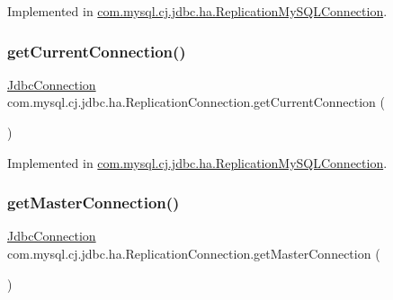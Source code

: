 Implemented in \mbox{\hyperlink{classcom_1_1mysql_1_1cj_1_1jdbc_1_1ha_1_1_replication_my_s_q_l_connection_a4d63ae17059125762c0103bbaed5e3c7}{com.\+mysql.\+cj.\+jdbc.\+ha.\+Replication\+My\+S\+Q\+L\+Connection}}.

\mbox{\label{interfacecom_1_1mysql_1_1cj_1_1jdbc_1_1ha_1_1_replication_connection_a0bfb42722305b18722f782067f85d538}} 
\subsubsection{\texorpdfstring{get\+Current\+Connection()}{getCurrentConnection()}}
{\footnotesize\ttfamily \mbox{\hyperlink{interfacecom_1_1mysql_1_1cj_1_1jdbc_1_1_jdbc_connection}{Jdbc\+Connection}} com.\+mysql.\+cj.\+jdbc.\+ha.\+Replication\+Connection.\+get\+Current\+Connection (\begin{DoxyParamCaption}{ }\end{DoxyParamCaption})}



Implemented in \mbox{\hyperlink{classcom_1_1mysql_1_1cj_1_1jdbc_1_1ha_1_1_replication_my_s_q_l_connection_a0d98dee5ddb333ca8f8cab2f41755205}{com.\+mysql.\+cj.\+jdbc.\+ha.\+Replication\+My\+S\+Q\+L\+Connection}}.

\mbox{\label{interfacecom_1_1mysql_1_1cj_1_1jdbc_1_1ha_1_1_replication_connection_ac4c0ab9593304c8a6928e376ac5d78d8}} 
\subsubsection{\texorpdfstring{get\+Master\+Connection()}{getMasterConnection()}}
{\footnotesize\ttfamily \mbox{\hyperlink{interfacecom_1_1mysql_1_1cj_1_1jdbc_1_1_jdbc_connection}{Jdbc\+Connection}} com.\+mysql.\+cj.\+jdbc.\+ha.\+Replication\+Connection.\+get\+Master\+Connection (\begin{DoxyParamCaption}{ }\end{DoxyParamCaption})}



